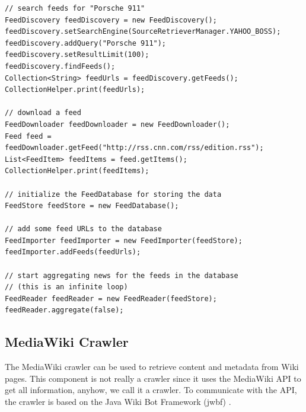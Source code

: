 \documentclass[a4paper,twoside]{book}      %
\begin{document}
\begin{codelisting}
\begin{lstlisting}[caption=Using the \texttt{feeds} package.,frame=tb,label=listing:feeds]
// search feeds for "Porsche 911"
FeedDiscovery feedDiscovery = new FeedDiscovery();
feedDiscovery.setSearchEngine(SourceRetrieverManager.YAHOO_BOSS);
feedDiscovery.addQuery("Porsche 911");
feedDiscovery.setResultLimit(100);
feedDiscovery.findFeeds();
Collection<String> feedUrls = feedDiscovery.getFeeds();
CollectionHelper.print(feedUrls);

// download a feed
FeedDownloader feedDownloader = new FeedDownloader();
Feed feed = feedDownloader.getFeed("http://rss.cnn.com/rss/edition.rss");
List<FeedItem> feedItems = feed.getItems();
CollectionHelper.print(feedItems);

// initialize the FeedDatabase for storing the data
FeedStore feedStore = new FeedDatabase();

// add some feed URLs to the database
FeedImporter feedImporter = new FeedImporter(feedStore);
feedImporter.addFeeds(feedUrls);

// start aggregating news for the feeds in the database
// (this is an infinite loop)
FeedReader feedReader = new FeedReader(feedStore);
feedReader.aggregate(false);
\end{lstlisting}
\end{codelisting}

\subsection{MediaWiki Crawler}\label{sec:MWCrawler}
The MediaWiki crawler can be used to retrieve content and metadata from Wiki pages. This component is not really a crawler since it uses the MediaWiki API \cite{MWAPI2011} to get all information, anyhow, we call it a crawler. To communicate with the API, the crawler is based on the Java Wiki Bot Framework (jwbf) \cite{jwbf2011}. 
\end{document}
